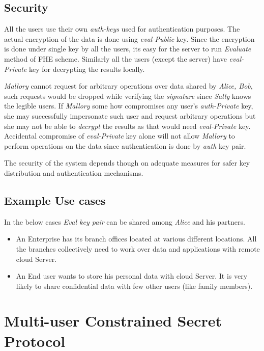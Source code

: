 \documentclass[conference]{IEEEtran}
\numberwithin{equation}{section}
\begin{document}
\subsection{Security}

All the users use their own \emph{auth-keys} used for authentication purposes. The actual encryption of the data is done using \emph{eval-Public} key. Since the encryption is done under single key by all the users, its easy for the server to run \emph{Evaluate} method of FHE scheme. Similarly all the users (except the server) have \emph{eval-Private} key for decrypting the results locally.

 \emph{Mallory} cannot request for arbitrary operations over data shared by \emph{Alice, Bob}, such requests would be dropped while verifying the \emph{signature} since \emph{Sally} knows the legible users. If \emph{Mallory} some how compromises any user's \emph{auth-Private} key, she may successfully impersonate such user and request arbitrary operations but she may not be able to \emph{decrypt} the results as that would need \emph{eval-Private} key. Accidental compromise of  \emph{eval-Private} key alone will not allow \emph{Mallory} to perform operations on the data since authentication is done by \emph{auth} key pair.

The security of the system depends though on adequate measures for safer key distribution and authentication mechanisms.
 
\subsection{Example Use cases}

In the below cases \emph{Eval  key pair} can be shared among \emph{Alice} and his partners.
\begin{itemize}
\item An Enterprise has its branch offices located at various different locations. All the branches collectively need to work over data and applications with remote cloud Server.
\item An End user wants to store his personal data with cloud Server. It is very likely to share confidential data with few other users (like family members).
\end{itemize}

\section{Multi-user Constrained Secret Protocol}
\end{document}
